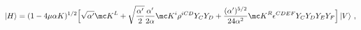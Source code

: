 \begin{equation}\label{hint}
\left|H\right>=(1-4\mu\alpha K)^{1/2}\Bigl[\sqrt{\alpha^\prime}{\mc K}^L+
\sqrt{\frac{\alpha^\prime}{2}}\frac{\alpha^\prime}{2\alpha}{\mc K}^i\rho^{iCD}Y_CY_D
+\frac{(\alpha^\prime)^{5/2}}{24\alpha^2}{\mc K}^R\epsilon^{CDEF}Y_CY_DY_EY_F\Bigr]\left|V\right>\,,
\end{equation}


